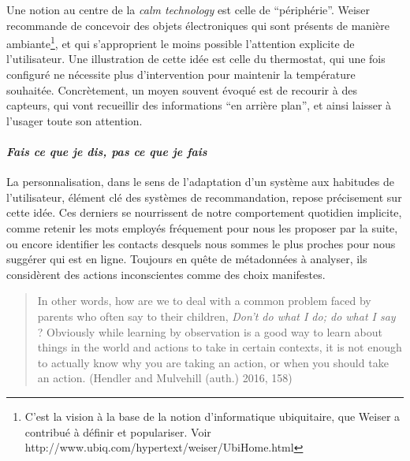 \documentclass[]{article}
\let\oldparagraph\paragraph
\renewcommand{\paragraph}[1]{\oldparagraph{#1}\mbox{}}
\begin{document}
Une notion au centre de la \emph{calm technology} est celle de
``périphérie''. Weiser recommande de concevoir des objets électroniques
qui sont présents de manière ambiante\footnote{C'est la vision à la base
  de la notion d'informatique ubiquitaire, que Weiser a contribué à
  définir et populariser. Voir
  http://www.ubiq.com/hypertext/weiser/UbiHome.html}, et qui
s'approprient le moins possible l'attention explicite de l'utilisateur.
Une illustration de cette idée est celle du thermostat, qui une fois
configuré ne nécessite plus d'intervention pour maintenir la température
souhaitée. Concrètement, un moyen souvent évoqué est de recourir à des
capteurs, qui vont recueillir des informations ``en arrière plan'', et
ainsi laisser à l'usager toute son attention.

\hypertarget{fais-ce-que-je-dis-pas-ce-que-je-fais}{%
\paragraph{\texorpdfstring{\emph{Fais ce que je dis, pas ce que je
fais}}{Fais ce que je dis, pas ce que je fais}}\label{fais-ce-que-je-dis-pas-ce-que-je-fais}}

La personnalisation, dans le sens de l'adaptation d'un système aux
habitudes de l'utilisateur, élément clé des systèmes de recommandation,
repose précisement sur cette idée. Ces derniers se nourrissent de notre
comportement quotidien implicite, comme retenir les mots employés
fréquement pour nous les proposer par la suite, ou encore identifier les
contacts desquels nous sommes le plus proches pour nous suggérer qui est
en ligne. Toujours en quête de métadonnées à analyser, ils considèrent
des actions inconscientes comme des choix manifestes.

\begin{quote}
In other words, how are we to deal with a common problem faced by
parents who often say to their children, \emph{Don't do what I do; do
what I say} ? Obviously while learning by observation is a good way to
learn about things in the world and actions to take in certain contexts,
it is not enough to actually know why you are taking an action, or when
you should take an action. (Hendler and Mulvehill (auth.) 2016, 158)
\end{quote}
\end{document}
